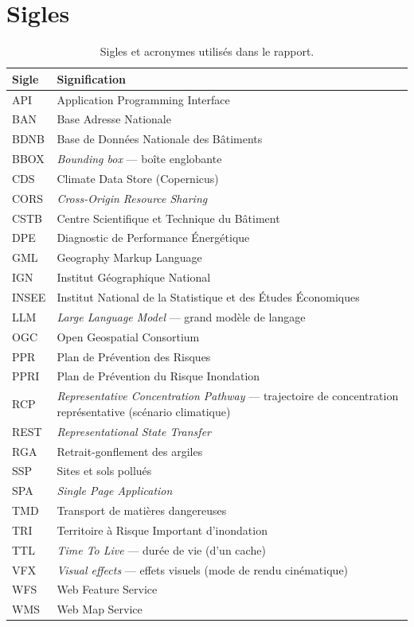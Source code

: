 \section{Sigles}

\begin{table}[H]
\centering
\small
\caption{Sigles et acronymes utilisés dans le rapport.}
\label{tab:sigles}
\begin{tabularx}{\textwidth}{@{}l X@{}}
\toprule
\textbf{Sigle} & \textbf{Signification} \\
\midrule
API & Application Programming Interface \\
BAN & Base Adresse Nationale \\
BDNB & Base de Données Nationale des Bâtiments \\
BBOX & \emph{Bounding box} — boîte englobante \\
CDS & Climate Data Store (Copernicus) \\
CORS & \emph{Cross-Origin Resource Sharing} \\
CSTB & Centre Scientifique et Technique du Bâtiment \\
DPE & Diagnostic de Performance Énergétique \\
GML & Geography Markup Language \\
IGN & Institut Géographique National \\
INSEE & Institut National de la Statistique et des Études Économiques \\
LLM & \emph{Large Language Model} — grand modèle de langage \\
OGC & Open Geospatial Consortium \\
PPR & Plan de Prévention des Risques \\
PPRI & Plan de Prévention du Risque Inondation \\
RCP & \emph{Representative Concentration Pathway} — trajectoire de
  concentration représentative (scénario climatique) \\
REST & \emph{Representational State Transfer} \\
RGA & Retrait-gonflement des argiles \\
SSP & Sites et sols pollués \\
SPA & \emph{Single Page Application} \\
TMD & Transport de matières dangereuses \\
TRI & Territoire à Risque Important d'inondation \\
TTL & \emph{Time To Live} — durée de vie (d'un cache) \\
VFX & \emph{Visual effects} — effets visuels (mode de rendu cinématique) \\
WFS & Web Feature Service \\
WMS & Web Map Service \\
\bottomrule
\end{tabularx}
\end{table}
